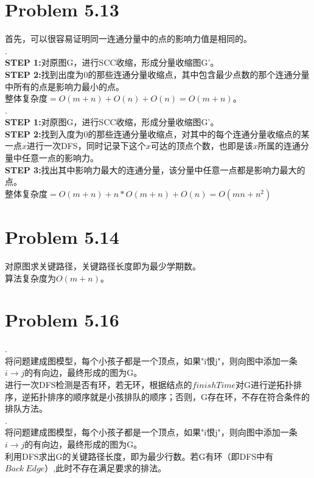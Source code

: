 \documentclass[twocolumn]{ctexart}
\begin{document}
\section*{Problem 5.13}
首先，可以很容易证明同一连通分量中的点的影响力值是相同的。\\
.\\
\indent \textbf{STEP 1:}对原图G，进行SCC收缩，形成分量收缩图G'。\\
\indent \textbf{STEP 2:}找到出度为0的那些连通分量收缩点，其中包含最少点数的那个连通分量中所有的点是影响力最小的点。\\
\indent 整体复杂度$=O(m+n)+O(n)+O(n)=O(m+n)$。\\
.\\
\indent \textbf{STEP 1:}对原图G，进行SCC收缩，形成分量收缩图G'。\\
\indent
\textbf{STEP 2:}找到入度为0的那些连通分量收缩点，对其中的每个连通分量收缩点的某一点$x$进行一次DFS，同时记录下这个$x$可达的顶点个数，也即是该$x$所属的连通分量中任意一点的影响力。\\
\indent \textbf{ STEP 3:}找出其中影响力最大的连通分量，该分量中任意一点都是影响力最大的点。\\
\indent 整体复杂度$=O(m+n)+n*O(m+n)+O(n)=O(mn+n^2)$\\

\section*{Problem 5.14}
\indent 对原图求关键路径，关键路径长度即为最少学期数。\\
\indent 算法复杂度为$O(m+n)$。\\



\section*{Problem 5.16}
.\\
\indent 将问题建成图模型，每个小孩子都是一个顶点，如果"i恨j"，则向图中添加一条$i\rightarrow j$的有向边，最终形成的图为G。\\
\indent
进行一次DFS检测是否有环，若无环，根据结点的$finishTime$对G进行逆拓扑排序，逆拓扑排序的顺序就是小孩排队的顺序；否则，G存在环，不存在符合条件的排队方法。\\

.\\
\indent 将问题建成图模型，每个小孩子都是一个顶点，如果"i恨j"，则向图中添加一条$i\rightarrow j$的有向边，最终形成的图为G。\\
\indent
利用DFS求出G的关键路径长度，即为最少行数。若G有环（即DFS中有$Back\ Edge$）,此时不存在满足要求的排法。\\
\end{document}
